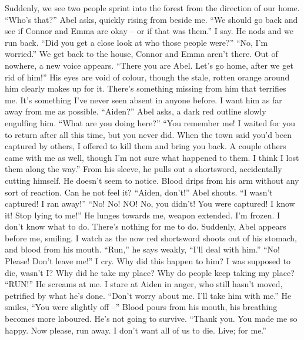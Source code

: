 \documentclass[openany, 12pt]{book}
\newcommand\tab[1][1cm]{\hspace*{#1}}
\begin{document}
\tab
Suddenly, we see two people sprint into the forest from the direction of our home. ``Who's that?'' Abel asks, quickly rising from beside me.
\newline
\tab
``We should go back and see if Connor and Emma are okay -- or if that was them.'' I say. He nods and we run back. ``Did you get a close look at who those people were?''
\newline
\tab
``No, I’m worried.'' We get back to the house, Connor and Emma aren’t there. Out of nowhere, a new voice appears.
\newline
\tab
``There you are Abel. Let’s go home, after we get rid of him!'' His eyes are void of colour, though the stale, rotten orange around him clearly makes up for it. There’s something missing from him that terrifies me. It’s something I’ve never seen absent in anyone before. I want him as far away from me as possible.
\newline
\tab
``Aiden?'' Abel asks, a dark red outline slowly engulfing him. ``What are you doing here?''
\newline
\tab
``You remember me! I waited for you to return after all this time, but you never did. When the town said you’d been captured by others, I offered to kill them and bring you back. A couple others came with me as well, though I’m not sure what happened to them. I think I lost them along the way.'' From his sleeve, he pulls out a shortsword, accidentally cutting himself. He doesn’t seem to notice. Blood drips from his arm without any sort of reaction. Can he not feel it?
\newline
\tab
``Aiden, don’t!'' Abel shouts. ``I wasn’t captured! I ran away!''
\newline
\tab
``No! No! NO! No, you didn’t! You were captured! I know it! Stop lying to me!'' He lunges towards me, weapon extended. I’m frozen. I don’t know what to do. There’s nothing for me to do. Suddenly, Abel appears before me, smiling. I watch as the now red shortsword shoots out of his stomach, and blood from his mouth. ``Run,'' he says weakly,  ``I’ll deal with him.''
\newline
\tab
``No! Please! Don’t leave me!'' I cry. Why did this happen to him? I was supposed to die, wasn’t I? Why did he take my place? Why do people keep taking my place?
\newline
\tab
``RUN!'' He screams at me. I stare at Aiden in anger, who still hasn’t moved, petrified by what he’s done. ``Don’t worry about me. I’ll take him with me.'' He smiles, ``You were slightly off --'' Blood pours from his mouth, his breathing becomes more laboured. He’s not going to survive. ``Thank you. You made me so happy. Now please, run away. I don’t want all of us to die. Live; for me.''
\end{document}
